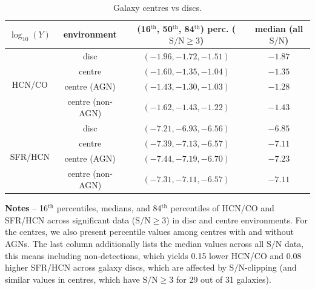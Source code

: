 \documentclass[letter, longauth]{aa} %
\newcommand*{\snr}{\ensuremath{\mathrm{S}/\mathrm{N}}\xspace}  %
\begin{document}
\begin{appendix}
\begin{table}
\begin{center}
\caption{Galaxy centres vs discs.}
\label{tab:centres}
\begin{tabular}{cccc}
\hline \hline
$\log_{10}(Y)$ &  environment & (16$^\mathrm{th}$, 50$^\mathrm{th}$, 84$^\mathrm{th}$) perc. ($\snr\geq 3$) & median (all \snr) \\
\hline
\multirow{4}{*}{HCN/CO}  &         disc     & $(-1.96,-1.72,-1.51)$ & $-1.87$ \\
                         &       centre     & $(-1.60,-1.35,-1.04)$ & $-1.35$ \\
                         & centre (AGN)     & $(-1.43,-1.30,-1.03)$ & $-1.28$ \\
                         & centre (non-AGN) & $(-1.62,-1.43,-1.22)$ & $-1.43$ \\
\hline
\multirow{4}{*}{SFR/HCN} &         disc     & $(-7.21,-6.93,-6.56)$ & $-6.85$ \\
                         &       centre     & $(-7.39,-7.13,-6.57)$ & $-7.11$ \\
                         & centre (AGN)     & $(-7.44,-7.19,-6.70)$ & $-7.23$ \\
                         & centre (non-AGN) & $(-7.31,-7.11,-6.57)$ & $-7.11$ \\
                         
\hline\hline
\end{tabular}
\end{center}
{\bf Notes} --
16$^\mathrm{th}$ percentiles, medians, and 84$^\mathrm{th}$ percentiles of HCN/CO and SFR/HCN across significant data ($\snr\geq 3$) in disc and centre environments.
For the centres, we also present percentile values among centres with and without AGNs.
The last column additionally lists the median values across all \snr data, this means including non-detections, which yields \SI{0.15}{\dex} lower HCN/CO and \SI{0.08}{\dex} higher SFR/HCN across galaxy discs, which are affected by \snr-clipping (and similar values in centres, which have $\snr\geq 3$ for 29 out of 31 galaxies).
\end{table}

\end{appendix}
\end{document}
